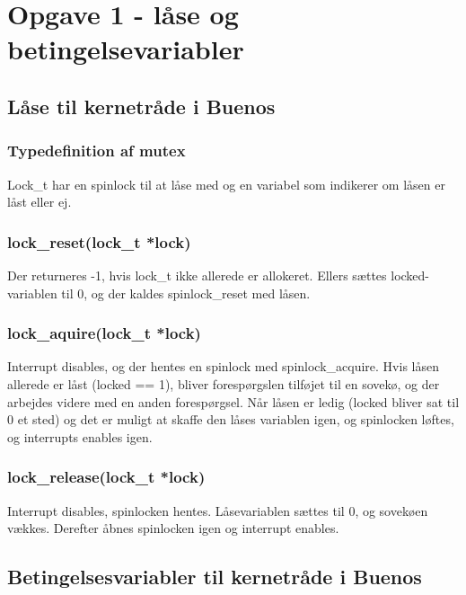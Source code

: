 \documentclass[10pt,a4paper,danish]{article}
\title{}
\author{Maria Caroline Miller, 040779, twq135 \\ Søren Pilgård, 190689, vpb984}
\begin{document}
\maketitle
\newpage


\section{Opgave 1 - låse og betingelsevariabler}
\subsection{Låse til kernetråde i Buenos}

\subsubsection{Typedefinition af mutex}
Lock\_t har en spinlock til at låse med og en variabel som indikerer om låsen er låst eller ej.

\subsubsection{lock\_reset(lock\_t *lock)}
Der returneres -1, hvis lock\_t ikke allerede er allokeret. Ellers sættes locked-variablen til 0, og der kaldes spinlock\_reset med låsen. 

\subsubsection{lock\_aquire(lock\_t *lock)}
Interrupt disables, og der hentes en spinlock med spinlock\_acquire. Hvis låsen allerede er låst (locked == 1), bliver forespørgslen tilføjet til en sovekø, og der arbejdes videre med en anden forespørgsel. Når låsen er ledig (locked bliver sat til 0 et sted) og det er muligt at skaffe den låses variablen igen, og spinlocken løftes, og interrupts enables igen.

\subsubsection{lock\_release(lock\_t *lock)}
Interrupt disables, spinlocken hentes. Låsevariablen sættes til 0, og sovekøen vækkes. Derefter åbnes spinlocken igen og interrupt enables.

\subsection{Betingelsesvariabler til kernetråde i Buenos}
\end{document}
